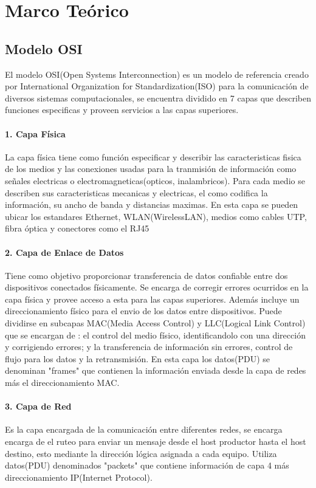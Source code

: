 \section{Marco Teórico}

\subsection{Modelo OSI}
  El modelo OSI(Open Systems Interconnection) es un modelo de referencia\cite{ISO_OSI} 
  creado por International Organization for Standardization(ISO) para la 
  comunicación de diversos sistemas computacionales\cite{cloudflare_OSI}, 
  se encuentra dividido en 7 capas que describen funciones especificas 
  y proveen servicios a las capas superiores.

  \paragraph{1. Capa Física}
  La capa física tiene como función especificar y describir las caracteristicas 
  fisica de los medios y las conexiones usadas para la tranmisión de información
  como señales electricas o electromagneticas(opticos, inalambricos).
  Para cada medio se describen sus caracteristicas mecanicas y electricas, el como codifica la información,
  su ancho de banda y distancias maximas.\cite{netacad_physical_layer}
  En esta capa se pueden ubicar los estandares Ethernet, WLAN(WirelessLAN), medios como cables UTP, fibra óptica y
  conectores como el RJ45
  \paragraph{2. Capa de Enlace de Datos}
  Tiene como objetivo proporcionar transferencia de datos confiable entre dos dispositivos 
  conectados físicamente. Se encarga de corregir errores ocurridos en la capa física y provee
  acceso a esta para las capas superiores. Además incluye un direccionamiento físico para el envio
  de los datos entre dispositivos.\cite{osi_windows}
  Puede dividirse en subcapas MAC(Media Access Control) y LLC(Logical Link Control)
  que se encargan de : el control del medio físico, identificandolo con una dirección y corrigiendo errores;
  y la transferencia de información sin errores, control de flujo para los datos y la retransmisión.
  En esta capa los datos(PDU) se denominan "frames" que contienen la información enviada desde la capa de redes
  más el direccionamiento MAC.

  \paragraph{3. Capa de Red}
  Es la capa encargada de la comunicación entre diferentes redes, se encarga encarga de el ruteo
  para enviar un mensaje desde el host productor hasta el host destino, esto mediante la dirección 
  lógica asignada a cada equipo. Utiliza datos(PDU) denominados "packets" que contiene información
  de capa 4 más direccionamiento IP(Internet Protocol).\cite{cloudflare_OSI}
